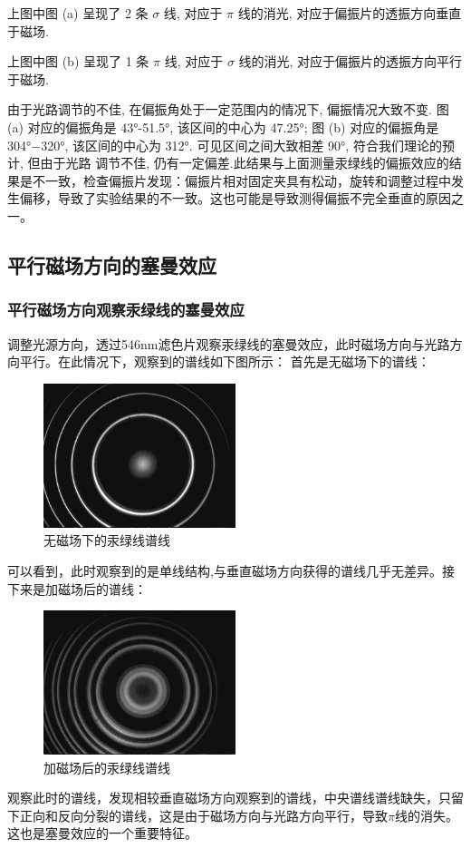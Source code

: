 \documentclass[12pt,a4paper]{article}
\begin{document}
上图中图 (a) 呈现了 2 条 $\sigma$ 线, 对应于 $\pi$ 线的消光, 对应于偏振片的透振方向垂直于磁场. 

上图中图 (b) 呈现了 1 条 $\pi$ 线, 对应于 $\sigma$ 线的消光, 对应于偏振片的透振方向平行
于磁场. 

由于光路调节的不佳, 在偏振角处于一定范围内的情况下, 偏振情况大致不变. 图
(a) 对应的偏振角是 43°-51.5°, 该区间的中心为 47.25°; 图 (b) 对应的偏振角是 304°−320°,
该区间的中心为 312°. 可见区间之间大致相差 90°, 符合我们理论的预计, 但由于光路
调节不佳, 仍有一定偏差.此结果与上面测量汞绿线的偏振效应的结果是不一致，检查偏振片发现：偏振片相对固定夹具有松动，旋转和调整过程中发生偏移，导致了实验结果的不一致。这也可能是导致测得偏振不完全垂直的原因之一。
\subsection{平行磁场方向的塞曼效应}
\subsubsection{平行磁场方向观察汞绿线的塞曼效应}
调整光源方向，透过546nm滤色片观察汞绿线的塞曼效应，此时磁场方向与光路方向平行。在此情况下，观察到的谱线如下图所示：
首先是无磁场下的谱线：
\begin{figure}[H]
    \centering
    \includegraphics[width=0.5\textwidth]{SingleRingh.jpg}
    \caption{无磁场下的汞绿线谱线}
\end{figure}
可以看到，此时观察到的是单线结构,与垂直磁场方向获得的谱线几乎无差异。接下来是加磁场后的谱线：
\begin{figure}[H]
    \centering
    \includegraphics[width=0.5\textwidth]{MultiRing@2.50A.jpg}
    \caption{加磁场后的汞绿线谱线}
\end{figure}
观察此时的谱线，发现相较垂直磁场方向观察到的谱线，中央谱线谱线缺失，只留下正向和反向分裂的谱线，这是由于磁场方向与光路方向平行，导致$\pi$线的消失。这也是塞曼效应的一个重要特征。
\end{document}
